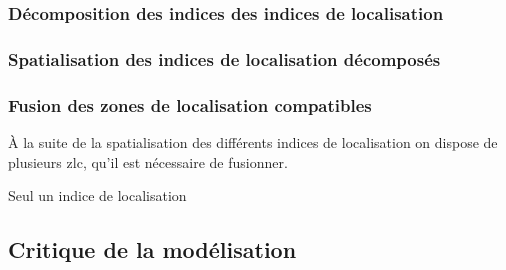 \subsubsection{Décomposition des indices des indices de localisation}
\label{subsec:9-2-2-2}

\subsubsection{Spatialisation des indices de localisation décomposés}
\label{subsec:9-2-2-3}

\subsubsection{Fusion des zones de localisation compatibles}
\label{subsec:9-2-2-4}

À la suite de la spatialisation des différents indices de localisation
on dispose de plusieurs \ac{zlc}, qu'il est nécessaire de fusionner.

Seul un indice de localisation 


\subsection{Critique de la modélisation}
\label{subsec:9-2-3}


